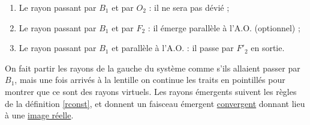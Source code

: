 \documentclass[../main/main.tex]{subfiles}
\begin{document}
\begin{enumerate}
    \item Le rayon passant par $B_1$ et par $O_2$ : il ne sera pas dévié ;
    \item Le rayon passant par $B_1$ et par $F_2$ : il émerge parallèle à l'A.O.
        (optionnel) ;
    \item Le rayon passant par $B_1$ et parallèle à l'A.O. : il passe par $F'_2$
        en sortie.
\end{enumerate}

On fait partir les rayons de la gauche du système comme s'ils allaient passer
par $B_1$, mais une fois arrivés à la lentille on continue les traits en
pointillés pour montrer que ce sont des rayons virtuels. Les rayons émergents
suivent les règles de la définition \ref{rconst}, et donnent un faisceau
émergent \underline{convergent} donnant lieu à une \underline{image réelle}.
\end{document}
